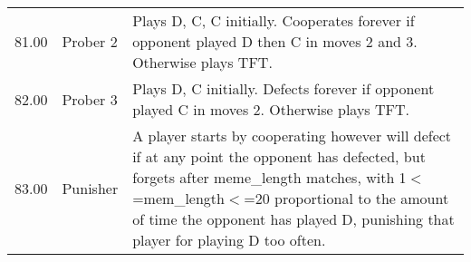 \begin{tabular}{rll}
	81.00  & Prober 2                    & Plays D, C, C initially. Cooperates forever if opponent played D then C
	in moves 2 and 3. Otherwise plays TFT.                                                                                                                                                                                                                                                                                                                                                                                                                                                                                                                                                                                                                                                                                                                                                                                                                                                                                                       \\
	82.00  & Prober 3                    & Plays D, C initially. Defects forever if opponent played C in moves 2.
	Otherwise plays TFT.                                                                                                                                                                                                                                                                                                                                                                                                                                                                                                                                                                                                                                                                                                                                                                                                                                                                                                                          \\
	83.00  & Punisher                    & A player starts by cooperating however will defect if at any point the
	opponent has defected, but forgets after meme\_length matches, with
	1\ensuremath{<}=mem\_length\ensuremath{<}=20 proportional to the amount of time the opponent has
	played D, punishing that player for playing D too often.                                                                                                                                                                                                                                                                                                                                                                                                                                                                                                                                                                                                                                                                                                                                     \\

\end{tabular}
